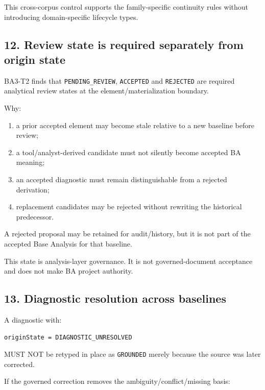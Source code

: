 \documentclass[11pt,a4paper]{article}
\providecommand{\tightlist}{\setlength{\itemsep}{0pt}\setlength{\parskip}{0pt}}\setlength{\emergencystretch}{4em}\hbadness=10000\hfuzz=20pt\sloppy
\begin{document}
This cross-corpus control supports the family-specific continuity rules
without introducing domain-specific lifecycle types.

\subsection{12. Review state is required separately from origin
state}\label{review-state-is-required-separately-from-origin-state}

BA3-T2 finds that \texttt{PENDING\_REVIEW}, \texttt{ACCEPTED} and
\texttt{REJECTED} are required analytical review states at the
element/materialization boundary.

Why:

\begin{enumerate}
\def\labelenumi{\arabic{enumi}.}
\tightlist
\item
  a prior accepted element may become stale relative to a new baseline
  before review;
\item
  a tool/analyst-derived candidate must not silently become accepted BA
  meaning;
\item
  an accepted diagnostic must remain distinguishable from a rejected
  derivation;
\item
  replacement candidates may be rejected without rewriting the
  historical predecessor.
\end{enumerate}

A rejected proposal may be retained for audit/history, but it is not
part of the accepted Base Analysis for that baseline.

This state is analysis-layer governance. It is not governed-document
acceptance and does not make BA project authority.

\subsection{13. Diagnostic resolution across
baselines}\label{diagnostic-resolution-across-baselines}

A diagnostic with:

\begin{verbatim}
originState = DIAGNOSTIC_UNRESOLVED
\end{verbatim}

MUST NOT be retyped in place as \texttt{GROUNDED} merely because the
source was later corrected.

If the governed correction removes the ambiguity/conflict/missing basis:
\end{document}
